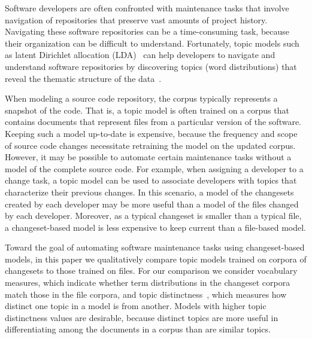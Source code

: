 Software developers are often confronted with maintenance tasks that involve navigation of repositories that preserve vast amounts of project history.
 Navigating these software repositories can be a time-consuming task, because their organization can be difficult to understand.
 Fortunately, topic models such as latent Dirichlet allocation (LDA)~\cite{Blei-etal:2003} can help developers to navigate and understand software repositories by discovering topics (word distributions) that reveal the thematic structure of the data~\cite{Linstead-etal:2007,Thomas-etal:2011,Hindle_etal:2012}.


When modeling a source code repository, the corpus typically represents a snapshot of the code.
That is, a topic model is often trained on a corpus that contains documents that represent files from a particular version of the software.
Keeping such a model up-to-date is expensive, because the frequency and scope of source code changes necessitate retraining the model on the updated corpus.
However, it may be possible to automate certain maintenance tasks without a model of the complete source code.
For example, when assigning a developer to a change task, a topic model can be used to associate developers with topics that characterize their previous changes.
In this scenario, a model of the changesets created by each developer may be more useful than a model of the files changed by each developer.
Moreover, as a typical changeset is smaller than a typical file, a changeset-based model is less expensive to keep current than a file-based model.

Toward the goal of automating software maintenance tasks using changeset-based models, in this paper we qualitatively compare topic models trained on corpora of changesets to those trained on files.
 For our comparison we consider vocabulary measures, which indicate whether term distributions in the changeset corpora match those in the file corpora, and topic distinctness~\cite{Wei-etal:2010,Thomas-etal:2011,Chuang-etal:2012}, which measures how distinct one topic in a model is from another.
 Models with higher topic distinctness values are desirable, because distinct topics are more useful in differentiating among the documents in a corpus than are similar topics.

